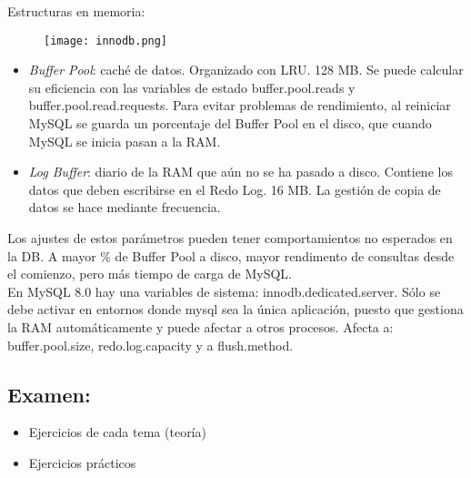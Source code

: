 \documentclass{article}
\begin{document}
Estructuras en memoria:
\begin{figure}[h]
\centering
\texttt{[image: innodb.png]}
\end{figure} 
\begin{itemize}
	\item \emph{Buffer Pool}: caché de datos. Organizado con LRU. 128 MB. Se puede calcular su eficiencia con las variables de estado buffer.pool.reads y buffer.pool.read.requests. Para evitar problemas de rendimiento, al reiniciar MySQL se guarda un porcentaje del Buffer Pool en el disco, que cuando MySQL se inicia pasan a la RAM. 
	\item \emph{Log Buffer}: diario de la RAM que aún no se ha pasado a disco. Contiene los datos que deben escribirse en el Redo Log. 16 MB. La gestión de copia de datos se hace mediante frecuencia.  
\end{itemize}
Los ajustes de estos parámetros pueden tener comportamientos no esperados en la DB. A mayor \% de Buffer Pool a disco, mayor rendimento de consultas desde el comienzo, pero más tiempo de carga de MySQL. \\
En MySQL 8.0 hay una variables de sistema: innodb.dedicated.server. Sólo se debe activar en entornos donde mysql sea la única aplicación, puesto que gestiona la RAM automáticamente y puede afectar a otros procesos. Afecta a: buffer.pool.size, redo.log.capacity y a flush.method. 
\subsection{Examen:}
\begin{itemize}
	\item Ejercicios de cada tema (teoría)
	\item Ejercicios prácticos
\end{itemize}
\end{document}

